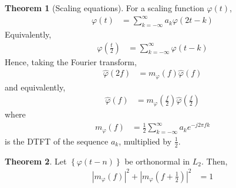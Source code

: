 \documentclass[titlepage, fleqn, a4paper, 12pt, twoside]{article}
\theoremstyle{definition}
\theoremstyle{theorem}
\newtheorem{theorem}{Theorem}
\begin{document}
\begin{theorem}[Scaling equations]
	For a scaling function $\varphi(t)$,
	\begin{align*}
		\varphi(t) &= \sum\limits_{k = -\infty}^{\infty} a_k \varphi(2 t - k)
	\end{align*}
	Equivalently,
	\begin{align*}
		\varphi\left( \frac{t}{2} \right) &= \sum\limits_{k = -\infty}^{\infty} \varphi(t - k)
	\end{align*}
	Hence, taking the Fourier transform,
	\begin{align*}
		\hat{\varphi}(2 f) &= m_{\varphi}(f) \hat{\varphi}(f)
	\end{align*}
	and equivalently,
	\begin{align*}
		\hat{\varphi}(f) &= m_{\varphi}\left( \frac{f}{2} \right) \hat{\varphi}\left( \frac{f}{2} \right)
	\end{align*}
	where
	\begin{align*}
		m_{\varphi}(f) &= \frac{1}{2} \sum\limits_{k = -\infty}^{\infty} a_k e^{-j 2 \pi f k}
	\end{align*}
	is the DTFT of the sequence $a_k$, multiplied by $\frac{1}{2}$.
	\label{thm:scaling_equations}
\end{theorem}

\begin{theorem}
	Let $\left\{ \varphi(t - n) \right\}$ be orthonormal in $L_2$.
	Then,
	\begin{align*}
		\left| m_{\varphi}(f) \right|^2 + \left| m_{\varphi}\left( f + \frac{1}{2} \right) \right|^2 &= 1
	\end{align*}
\end{theorem}
\end{document}
